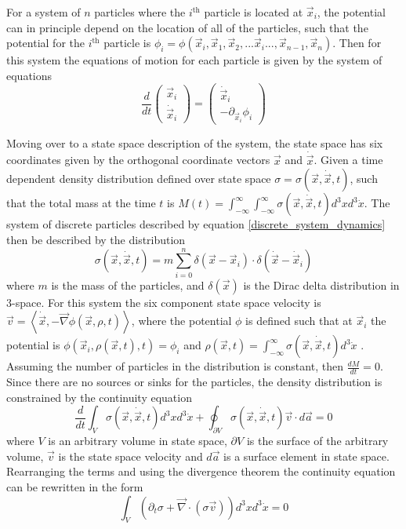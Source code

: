 \documentclass[%
 twocolumn,
 preprint, onecolumn,
 amsmath,amssymb,
 aps,
]{revtex4-1}
\newcommand{\dvec}[1]{\dot{\vec{#1}}}
\newcommand{\grad}{\vec{\nabla}}
\newcommand{\intVdot}[1]{\int_{-\infty}^{\infty} #1 d^3\dot{x}}
\newcommand{\intVVdot}[1]{\int_{-\infty}^{\infty}\int_{-\infty}^{\infty} #1 d^3xd^3\dot{x}}
\begin{document}
For a system of $n$ particles where the $i^{\text{th}}$ particle is located at $\vec{x}_i$, the potential can in principle depend on the location of all of the particles, such that the potential for the $i^{\text{th}}$ particle is $\phi_i = \phi({\vec{x}_i, \vec{x}_1, \vec{x}_2, ... \vec{x}_i ... , \vec{x}_{n-1}, \vec{x}_n})$. Then for this system the equations of motion for each particle is given by the system of equations
\begin{equation}
\frac{d}{dt}\begin{pmatrix} \vec{x}_i \\ \dvec{x}_i \end{pmatrix}=\begin{pmatrix} \dvec{x}_i \\ -\partial_{\vec{x}_i}\phi_i \end{pmatrix}
\label{discrete_system_dynamics}
\end{equation}

Moving over to a state space description of the system, the state space has six coordinates given by the orthogonal coordinate vectors $\vec{x}$ and $\dvec{x}$. Given a time dependent density distribution defined over state space $\sigma=\sigma(\vec{x}, \dvec{x}, t)$, such that the total mass at the time $t$ is $M(t)=\intVVdot{\sigma(\vec{x}, \dvec{x}, t)}$. The system of discrete particles described by equation \eqref{discrete_system_dynamics} then be described by the distribution
\[
\sigma(\vec{x}, \dvec{x}, t) = m\sum^n_{i=0}\delta(\vec{x} - \vec{x}_i)\cdot\delta(\dvec{x} - \dvec{x}_i)
\]
where $m$ is the mass of the particles, and $\delta(\vec{x})$ is the Dirac delta distribution in 3-space. For this system the six component state space velocity is $\vec{v}=\left\langle\dvec{x}, -\grad\phi(\vec{x}, \rho, t)\right\rangle$, where the potential $\phi$ is defined such that at $\vec{x}_i$ the potential is $\phi(\vec{x}_i, \rho(\vec{x}, t), t)=\phi_i$ and $\rho(\vec{x}, t)=\intVdot{\sigma(\vec{x}, \dvec{x}, t)}$ . Assuming the number of particles in the distribution is constant, then $\frac{dM}{dt}=0$. Since there are no sources or sinks for the particles, the density distribution is constrained by the continuity equation
\[
\frac{d}{dt}\int_{V}\sigma(\vec{x}, \dvec{x}, t)d^3xd^3\dot{x}+\oint_{\partial V}\sigma(\vec{x}, \dvec{x}, t)\vec{v}\cdot d\vec{a}=0
\]
where $V$ is an arbitrary volume in state space, $\partial V$ is the surface of the arbitrary volume, $\vec{v}$ is the state space velocity and $d\vec{a}$ is a surface element in state space. Rearranging the terms and using the divergence theorem the continuity equation can be rewritten in the form
\[
\int_V\left(\partial_t\sigma + \grad\cdot\left(\sigma\vec{v}\right)\right)d^3xd^3\dot{x}=0
\]
\end{document}

